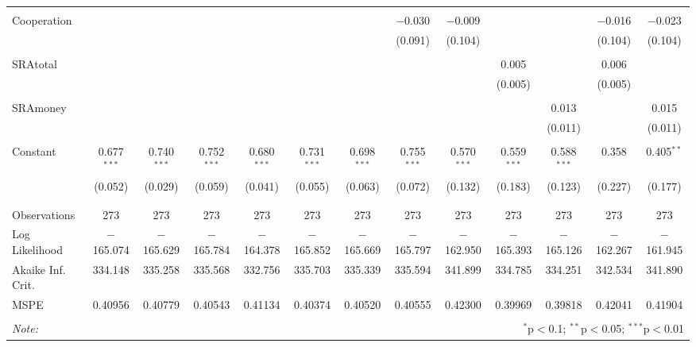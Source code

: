 \documentclass[12pt]{article}
\begin{document}
\begin{table}[!htbp]
\begin{adjustbox}{width=\textwidth}
\begin{tabular}{@{\extracolsep{5pt}}lcccccccccccc}
  & & & & & & & & & & & & \\ 
 Cooperation &  &  &  &  &  &  & $-$0.030 & $-$0.009 &  &  & $-$0.016 & $-$0.023 \\ 
  &  &  &  &  &  &  & (0.091) & (0.104) &  &  & (0.104) & (0.104) \\ 
  & & & & & & & & & & & & \\ 
 SRAtotal &  &  &  &  &  &  &  &  & 0.005 &  & 0.006 &  \\ 
  &  &  &  &  &  &  &  &  & (0.005) &  & (0.005) &  \\ 
  & & & & & & & & & & & & \\ 
 SRAmoney &  &  &  &  &  &  &  &  &  & 0.013 &  & 0.015 \\ 
  &  &  &  &  &  &  &  &  &  & (0.011) &  & (0.011) \\ 
  & & & & & & & & & & & & \\ 
 Constant & 0.677$^{***}$ & 0.740$^{***}$ & 0.752$^{***}$ & 0.680$^{***}$ & 0.731$^{***}$ & 0.698$^{***}$ & 0.755$^{***}$ & 0.570$^{***}$ & 0.559$^{***}$ & 0.588$^{***}$ & 0.358 & 0.405$^{**}$ \\ 
  & (0.052) & (0.029) & (0.059) & (0.041) & (0.055) & (0.063) & (0.072) & (0.132) & (0.183) & (0.123) & (0.227) & (0.177) \\ 
  & & & & & & & & & & & & \\ 
\hline \\[-1.8ex] 
Observations & 273 & 273 & 273 & 273 & 273 & 273 & 273 & 273 & 273 & 273 & 273 & 273 \\ 
Log Likelihood & $-$165.074 & $-$165.629 & $-$165.784 & $-$164.378 & $-$165.852 & $-$165.669 & $-$165.797 & $-$162.950 & $-$165.393 & $-$165.126 & $-$162.267 & $-$161.945 \\ 
Akaike Inf. Crit. & 334.148 & 335.258 & 335.568 & 332.756 & 335.703 & 335.339 & 335.594 & 341.899 & 334.785 & 334.251 & 342.534 & 341.890 \\ 
MSPE & 0.40956 & 0.40779 & 0.40543 & 0.41134 & 0.40374 & 0.40520 & 0.40555 & 0.42300 & 0.39969 & 0.39818 & 0.42041 & 0.41904 \\
\hline 
\hline \\[-1.8ex] 
\textit{Note:}  & \multicolumn{12}{r}{$^{*}$p$<$0.1; $^{**}$p$<$0.05; $^{***}$p$<$0.01} \\ 
\end{tabular} 
\end{adjustbox}
\end{table} 
\end{document}

